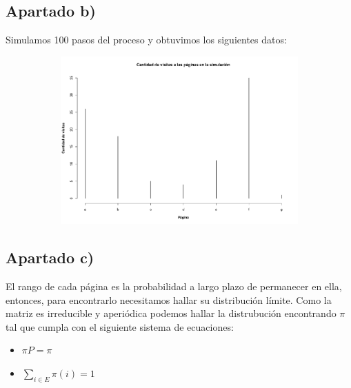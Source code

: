 \documentclass[11pt]{article}
\begin{document}

\subsection*{Apartado b)}

Simulamos 100 pasos del proceso y obtuvimos los siguientes datos:

\begin{figure}[h!]
  \begin{center}
    \begin{subfigure}[b]{0.9\linewidth}
      \includegraphics[width=\linewidth]{bastonesPageRank.pdf}
    \end{subfigure}
  \end{center}
\end{figure}


\subsection*{Apartado c)}

El rango de cada página es la probabilidad a largo plazo de permanecer en ella,
entonces, para encontrarlo necesitamos hallar su distribución límite. Como la matriz
es irreducible y aperiódica podemos hallar la distrubución encontrando
$\pi$ tal que cumpla con el siguiente sistema de ecuaciones:

\begin{itemize}
  \item $\pi P = \pi$
  \item $\displaystyle\sum_{i \in E} \pi(i) = 1$
\end{itemize}
\end{document}
